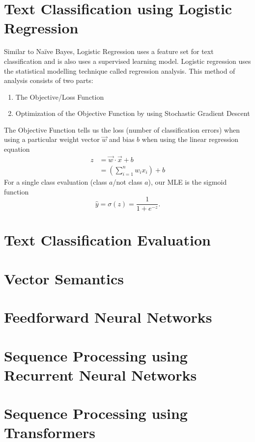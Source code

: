 \documentclass[12pt]{report}
\begin{document}
\section{Text Classification using Logistic Regression}
Similar to Na\"ive Bayes, Logistic Regression uses a feature set for text
classification and is also uses a supervised learning model.  Logistic
regression uses the statistical modelling technique called regression analysis.
This method of analysis consists of two parts:
\begin{enumerate}
  \item The Objective/Loss Function
  \item Optimization of the Objective Function by using Stochastic Gradient
  Descent
\end{enumerate}
The Objective Function tells us the loss (number of classification errors) when
using a particular weight vector $\vec{w}$ and bias $b$ when using the linear
regression equation
\begin{align*}
  z &= \vec{w} \cdot \vec{x} + b\\
  &= \left(\sum_{i = 1}^n w_i x_i \right) + b
\end{align*}
For a single class evaluation (class $a$/not class $a$), our MLE is the sigmoid function
\[ \hat{y} = \sigma(z) = \frac{1}{1 + e^{ - z}}. \]


\section{Text Classification Evaluation}

\section{Vector Semantics}

\section{Feedforward Neural Networks}

\section{Sequence Processing using Recurrent Neural Networks}

\section{Sequence Processing using Transformers}
\end{document}
